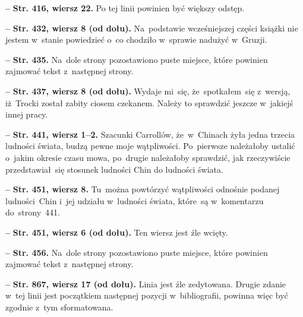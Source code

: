 \documentclass[a4paper,11pt]{article}  %
\newcommand{\spaceFour}{0.5em}
\newcommand{\tb}{\textbf}
\newcommand{\noi}{\noindent}
\newcommand{\start}{\noi \tb{--} {}}
\newcommand{\Str}[1]{\tb{Str. #1.}}
\newcommand{\StrWg}[2]{\tb{Str. #1, wiersz #2.}}
\newcommand{\StrWd}[2]{\tb{Str. #1, wiersz #2 (od dołu).}}
\begin{document}
\vspace{\spaceFour}


\start \StrWg{416}{22} Po tej linii powinien być większy odstęp.

\vspace{\spaceFour}


\start \StrWd{432}{8} Na~podstawie wcześniejszej części książki nie
jestem w~stanie powiedzieć o~co chodziło w~sprawie nadużyć w~Gruzji.

\vspace{\spaceFour}


\start \Str{435} Na~dole strony pozostawiono puste miejsce, które
powinien zajmować tekst z~następnej strony.

\vspace{\spaceFour}


\start \StrWd{437}{8} Wydaje mi~się, że~spotkałem~się z~wersją,
iż~Trocki został zabity ciosem czekanem. Należy to sprawdzić jeszcze
w~jakiejś innej pracy.

\vspace{\spaceFour}


\start \StrWg{441}{1--2} Szacunki Carrollów, że~w~Chinach żyła jedna
trzecia ludności świata, budzą pewne moje wątpliwości. Po~pierwsze
należałoby ustalić o~jakim okresie czasu mowa, po~drugie należałoby
sprawdzić, jak rzeczywiście przedstawiał~się stosunek ludności Chin do
ludności świata.

\vspace{\spaceFour}


\start \StrWg{451}{8} Tu~można powtórzyć wątpliwości odnośnie podanej
ludności~Chin i~jej udziału w~ludności świata, które~są w~komentarzu
do~strony~441.

\vspace{\spaceFour}


\start \StrWd{451}{6} Ten wiersz jest źle wcięty.

\vspace{\spaceFour}


\start \Str{456} Na~dole strony pozostawiono puste miejsce, które
powinien zajmować tekst z~następnej strony.

\vspace{\spaceFour}


\start \StrWd{867}{17} Linia jest źle zedytowana. Drugie zdanie w~tej
linii jest początkiem następnej pozycji w~bibliografii, powinna więc
być zgodnie z~tym sformatowana.

\vspace{\spaceFour}
\end{document}

